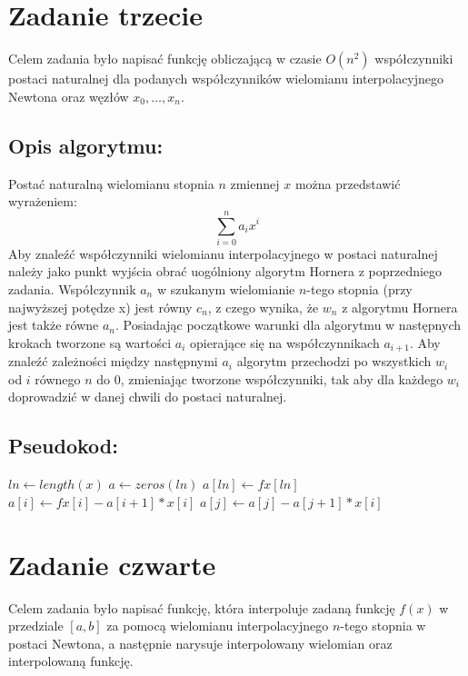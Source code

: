\documentclass{article}
\begin{document}
\section{Zadanie trzecie}
Celem zadania było napisać funkcję obliczającą 
w czasie \(O(n^2)\) współczynniki postaci naturalnej 
dla podanych współczynników wielomianu interpolacyjnego 
Newtona oraz węzłów \(x_0, \dots, x_n\).

\subsection{Opis algorytmu:}
Postać naturalną wielomianu stopnia $n$ zmiennej $x$ 
można przedstawić wyrażeniem:
\[\sum_{i=0}^{n} a_ix^i\]
Aby znaleźć współczynniki wielomianu interpolacyjnego 
w postaci naturalnej należy jako punkt wyjścia obrać 
uogólniony algorytm Hornera z poprzedniego zadania. 
Współczynnik $a_n$ w szukanym wielomianie $n$-tego 
stopnia (przy najwyższej potędze x) jest równy $c_n$, z czego 
wynika, że $w_n$ z algorytmu Hornera jest także równe $a_n$. 
\newline
\newline
Posiadając początkowe warunki dla algorytmu w następnych 
krokach tworzone są wartości $a_i$ opierające się na 
współczynnikach $a_{i+1}$. Aby znaleźć zależności 
między następnymi $a_i$ algorytm przechodzi po 
wszystkich $w_i$ od $i$ równego $n$ do $0$, zmieniając 
tworzone współczynniki, tak aby dla każdego $w_i$ 
doprowadzić w danej chwili do postaci naturalnej.
\newline
\newline
\newline
\subsection{Pseudokod:}\quad
\begin{algorithm}
    \DontPrintSemicolon
    \;
    $ln \gets length(x)$
    $a \gets zeros(ln)$
    $a[ln] \gets fx[ln]$
    \;
     {
        $a[i] \gets fx[i] - a[i + 1] * x[i]$
         {
            $a[j] \gets a[j] - a[j + 1] * x[i]$
        }
    }
    \;
\end{algorithm}

\section{Zadanie czwarte}
Celem zadania było napisać funkcję, która interpoluje 
zadaną funkcję $f(x)$ w przedziale $[a,b]$ za pomocą 
wielomianu interpolacyjnego $n$-tego stopnia w postaci 
Newtona, a następnie narysuje interpolowany wielomian 
oraz interpolowaną funkcję.
\end{document}
